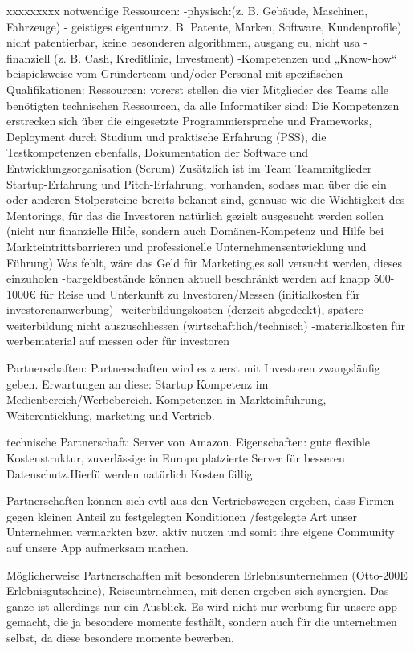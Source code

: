  xxxxxxxxx
 notwendige Ressourcen:
 -physisch:(z. B. Gebäude, Maschinen, Fahrzeuge)
 - geistiges eigentum:z. B. Patente, Marken, Software, Kundenprofile)
  nicht patentierbar, keine besonderen algorithmen, ausgang eu, nicht usa
 -finanziell (z. B. Cash, Kreditlinie, Investment)
 -Kompetenzen und „Know-how“ beispielsweise vom Gründerteam und/oder Personal mit spezifischen Qualifikationen:
 Ressourcen: 
 vorerst stellen die vier Mitglieder des Teams alle benötigten technischen Ressourcen, da alle Informatiker sind:
 Die Kompetenzen erstrecken sich über die eingesetzte Programmiersprache und Frameworks, Deployment durch Studium und praktische Erfahrung (PSS),
 die Testkompetenzen ebenfalls, Dokumentation der Software und Entwicklungsorganisation (Scrum)
 Zusätzlich ist im Team Teammitglieder Startup-Erfahrung und Pitch-Erfahrung, vorhanden, sodass man über die ein oder anderen Stolpersteine bereits bekannt sind, genauso
 wie die Wichtigkeit des Mentorings, für das die Investoren natürlich gezielt ausgesucht werden sollen (nicht nur finanzielle Hilfe, sondern auch Domänen-Kompetenz und Hilfe bei Markteintrittsbarrieren
 und professionelle Unternehmensentwicklung und Führung)
 Was fehlt, wäre das Geld für Marketing,es soll versucht werden, dieses einzuholen
 -bargeldbestände können aktuell beschränkt werden auf knapp 500-1000€ für Reise und Unterkunft zu Investoren/Messen (initialkosten für investorenanwerbung)
 -weiterbildungskosten (derzeit abgedeckt), spätere weiterbildung nicht auszuschliessen (wirtschaftlich/technisch)
 -materialkosten für werbematerial auf messen oder für investoren
 
 
 
 Partnerschaften:
 Partnerschaften wird es zuerst mit Investoren zwangsläufig geben.
 Erwartungen an diese: Startup Kompetenz im Medienbereich/Werbebereich.
 Kompetenzen in Markteinführung, Weiterenticklung, marketing und Vertrieb.
 
 technische Partnerschaft: Server von Amazon. 
 Eigenschaften: gute flexible Kostenstruktur, zuverlässige in Europa platzierte 
 Server für besseren Datenschutz.Hierfü werden natürlich Kosten fällig.
 
 Partnerschaften können sich evtl aus den Vertriebswegen ergeben, dass Firmen
 gegen kleinen Anteil zu festgelegten Konditionen /festgelegte Art unser Unternehmen vermarkten
 bzw. aktiv nutzen und somit ihre eigene Community auf unsere App aufmerksam machen.
 
 Möglicherweise Partnerschaften mit besonderen Erlebnisunternehmen (Otto-200E Erlebnisgutscheine), Reiseuntrnehmen,
 mit denen ergeben sich synergien. Das ganze ist allerdings nur ein Ausblick.
 Es wird nicht nur werbung für unsere app gemacht, die ja besondere momente festhält, sondern auch für die unternehmen selbst,
 da diese besondere momente bewerben.
 
